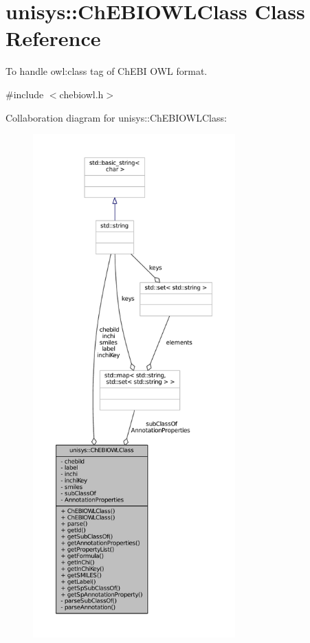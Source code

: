 \hypertarget{classunisys_1_1ChEBIOWLClass}{\section{unisys\-:\-:Ch\-E\-B\-I\-O\-W\-L\-Class Class Reference}
\label{classunisys_1_1ChEBIOWLClass}
}


To handle owl\-:class tag of Ch\-E\-B\-I O\-W\-L format.  




{\ttfamily \#include $<$chebiowl.\-h$>$}



Collaboration diagram for unisys\-:\-:Ch\-E\-B\-I\-O\-W\-L\-Class\-:
\nopagebreak
\begin{figure}[H]
\begin{center}
\leavevmode
\includegraphics[height=550pt]{classunisys_1_1ChEBIOWLClass__coll__graph}
\end{center}
\end{figure}
